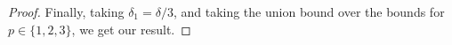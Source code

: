 \documentclass[tablecaption=bottom]{jmlr}
\newcommand\sD{\ensuremath{\mathcal{D}}}
\newcommand\op{{\text{\rm op}}}
\newcommand{\Lop}{\textrm{op}}
\begin{document}
\begin{proof}

Finally, taking $\delta_1 = \delta/3$, and taking the union bound over the bounds for $p \in \{1,2,3\}$,
we get our result.
\end{proof}
\end{document}
